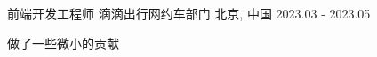 

\begin{cventries}

  \cventry
    {前端开发工程师} %
    {滴滴出行\hspace{1mm}网约车部门} %
    {北京, 中国} %
    {2023.03 - 2023.05} %
    {
      \begin{cvitems} %
        \item {做了一些微小的贡献}
      \end{cvitems}
    }

\end{cventries}
